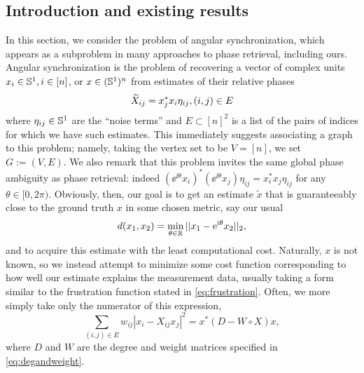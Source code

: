 \subsection{Introduction and existing results}
In this section, we consider the problem of angular synchronization, which appears as a subproblem in many approaches to phase retrieval, including ours.  Angular synchronization is the problem of recovering a vector of complex units $x_i \in \mathbb{S}^1, i \in [n]$, or $x \in (\mathbb{S}^1)^n$ from estimates of their relative phases \[\widetilde{X}_{ij} = x_j^* x_i \eta_{ij}, (i, j) \in E\] where $\eta_{ij} \in \mathbb{S}^1$ are the ``noise terms'' and $E \subset [n]^2$ is a list of the pairs of indices for which we have such estimates.  This immediately suggests associating a graph to this problem; namely, taking the vertex set to be $V = [n]$, we set $G := (V, E)$.  We also remark that this problem invites the same global phase ambiguity as phase retrieval: indeed $(\ee^{\ii \theta} x_i)^* (\ee^{\ii \theta} x_j) \eta_{ij} = x_i^* x_j \eta_{ij}$ for any $\theta \in [0, 2\pi)$.  Obviously, then, our goal is to get an estimate $\tilde{x}$ that is guaranteeably close to the ground truth $x$ in some chosen metric, say our usual \[d(x_1, x_2) = \min_{\theta \in \mathbb{R}} || x_1 - \mathrm{e}^{\mathrm{i} \theta} x_2 ||_2,\] and to acquire this estimate with the least computational cost.  Naturally, $x$ is not known, so we instead attempt to minimize some cost function corresponding to how well our estimate explains the measurement data, usually taking a form similar to the frustration function stated in \eqref{eq:frustration}.  Often, we more simply take only the numerator of this expression, \[\sum_{(i, j) \in E} w_{ij} |x_i - X_{ij} x_j|^2 = x^* (D - W \circ X) x, \label{eq:ang_sync_cost}\] where $D$ and $W$ are the degree and weight matrices specified in \eqref{eq:degandweight}.

